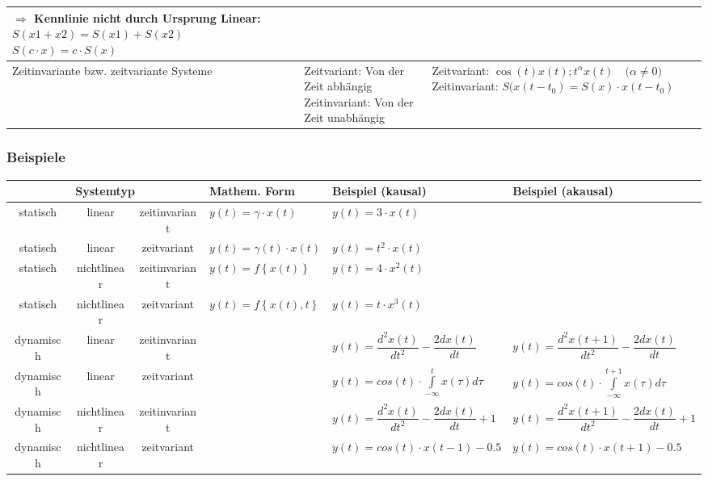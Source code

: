 \begin{tabularx}{\textwidth}{|p{4.5cm}|p{6cm}|X|}
			\textbf{$\Longrightarrow$ Kennlinie nicht durch Ursprung}\newline
			Linear: $S(x1+x2)=S(x1)+S(x2)$ \newline
					$S(c\cdot x)=c\cdot S(x)$
		\\ \hline
			Zeitinvariante bzw. zeitvariante Systeme \skript{118}
		& 	Zeitvariant: Von der Zeit abhängig \newline
			Zeitinvariant: Von der Zeit unabhängig
		& 	Zeitvariant: $\cos(t) x(t); t^{\alpha} x(t) \quad \text{(} \alpha \neq 0 \text{)} $ \newline
			Zeitinvariant: $S(x(t-t_0)=S(x)\cdot x(t-t_0)$
		\\ \hline 
		\end{tabularx}
		
		
		\subsubsection{Beispiele }

			\bgroup
			\setlength{\tabcolsep}{1.3mm}
			\begin{tabularx}{\textwidth}{|c|c|c|l|l|X|}
			\hline
				\multicolumn{3}{|c|}{\textbf{Systemtyp}}
			&	\textbf{Mathem. Form}
			&	\textbf{Beispiel (kausal)}
			&	\textbf{Beispiel (akausal)}
			\\ \hline
				statisch
			&	linear
			&	zeitinvariant
			&	$y(t) = \gamma \cdot x(t)$
			&	$y(t) = 3 \cdot x(t)$
			&	
			\\ \hline
				statisch
			&	linear
			&	zeitvariant
			&	$y(t) = \gamma(t) \cdot x(t)$
			&	$y(t) = t^2 \cdot x(t)$
			&	
			\\ \hline
				statisch
			&	nichtlinear
			&	zeitinvariant
			&	$y(t) = f \left\lbrace  x(t) \right\rbrace $
			&	$y(t) = 4 \cdot x^2(t)$
			&	
			\\ \hline
				statisch
			&	nichtlinear
			&	zeitvariant
			&	$y(t) = f \left\lbrace  x(t),t \right\rbrace $
			&	$y(t) = t \cdot x^3(t)$
			&	
			\\ \hline
				dynamisch
			&	linear
			&	zeitinvariant
			&	
			&	$y(t) = \dfrac{d^2 x(t)}{d t^2} - \dfrac{2 dx(t)}{dt}$
			&	$y(t) = \dfrac{d^2 x(t+1)}{d t^2} - \dfrac{2 dx(t)}{dt}$
			\\ \hline
				dynamisch
			&	linear
			&	zeitvariant
			&	
			&	$y(t) = cos(t) \cdot \int\limits_{-\infty}^{t} x(\tau) d\tau $
			&	$y(t) = cos(t) \cdot \int\limits_{-\infty}^{t+1} x(\tau) d\tau $
			\\ \hline
				dynamisch
			&	nichtlinear
			&	zeitinvariant
			&	
			&	$y(t) = \dfrac{d^2 x(t)}{d t^2} - \dfrac{2 dx(t)}{dt} + 1$
			&	$y(t) = \dfrac{d^2 x(t+1)}{d t^2} - \dfrac{2 dx(t)}{dt} + 1$
			\\ \hline
				dynamisch
			&	nichtlinear
			&	zeitvariant
			&	
			&	$ \ddot y(t) = cos(t) \cdot x(t-1) - 0.5$
			&	$ \ddot y(t) = cos(t) \cdot x(t+1) - 0.5$
			\\ \hline
			\end{tabularx}
			\egroup
			
